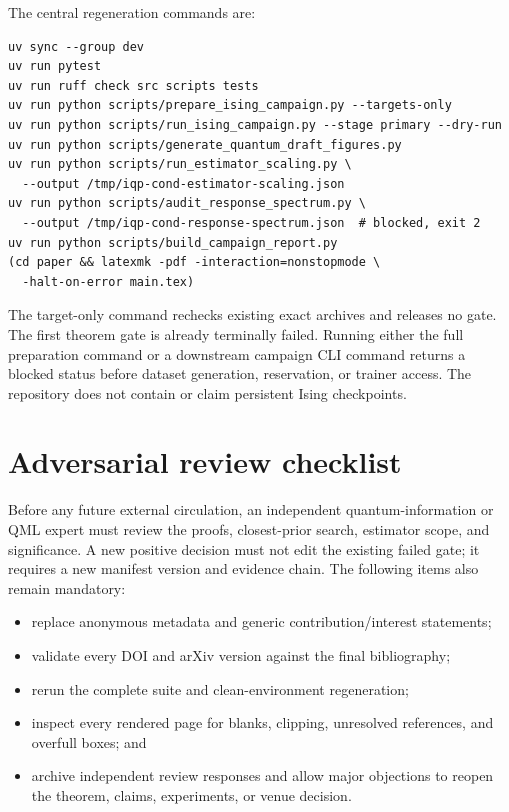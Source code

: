 The central regeneration commands are:
\begin{verbatim}
uv sync --group dev
uv run pytest
uv run ruff check src scripts tests
uv run python scripts/prepare_ising_campaign.py --targets-only
uv run python scripts/run_ising_campaign.py --stage primary --dry-run
uv run python scripts/generate_quantum_draft_figures.py
uv run python scripts/run_estimator_scaling.py \
  --output /tmp/iqp-cond-estimator-scaling.json
uv run python scripts/audit_response_spectrum.py \
  --output /tmp/iqp-cond-response-spectrum.json  # blocked, exit 2
uv run python scripts/build_campaign_report.py
(cd paper && latexmk -pdf -interaction=nonstopmode \
  -halt-on-error main.tex)
\end{verbatim}
The target-only command rechecks existing exact archives and releases no gate.
The first theorem gate is already terminally failed.  Running either the full
preparation command or a downstream campaign CLI command returns a blocked
status before dataset generation, reservation, or trainer access.  The
repository does not contain or claim persistent Ising checkpoints.

\section{Adversarial review checklist}
\label{app:review}

Before any future external circulation, an independent quantum-information or
QML expert must review the proofs, closest-prior search, estimator scope, and
significance.  A new positive decision must not edit the existing failed gate;
it requires a new manifest version and evidence chain.  The following items
also remain mandatory:
\begin{itemize}
\item replace anonymous metadata and generic contribution/interest statements;
\item validate every DOI and arXiv version against the final bibliography;
\item rerun the complete suite and clean-environment regeneration;
\item inspect every rendered page for blanks, clipping, unresolved references,
and overfull boxes; and
\item archive independent review responses and allow major objections to
reopen the theorem, claims, experiments, or venue decision.
\end{itemize}

